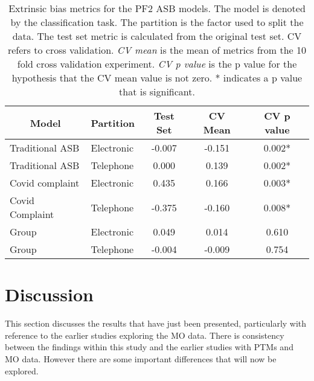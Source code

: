 \begin{table}[]
\begin{tabular}{@{}llccc@{}}
\multicolumn{1}{c}{Model} & \multicolumn{1}{c}{Partition} & Test Set & CV Mean & CV p value \\ \midrule
Traditional ASB                                   & Electronic                                            & -0.007   & -0.151  & 0.002*      \\
Traditional ASB                                   & Telephone                                             & 0.000    & 0.139   & 0.002*      \\
Covid complaint                                   & Electronic                                            & 0.435    & 0.166   & 0.003*      \\
Covid Complaint                                   & Telephone                                             & -0.375   & -0.160  & 0.008*      \\
Group                                         & Electronic                                            & 0.049    & 0.014   & 0.610      \\
Group                                         & Telephone                                             & -0.004   & -0.009  & 0.754      \\ \bottomrule
\end{tabular}
\caption[ASB incident logs Bias Table]{\label{tab:asb_bias} Extrinsic bias metrics for the PF2 ASB models. The model is denoted by the classification task. The partition is the factor used to split the data. The test set metric is calculated from the original test set. CV refers to cross validation. \emph{CV mean} is the mean of metrics from the 10 fold cross validation experiment. \emph{CV p value} is the p value for the hypothesis that the CV mean value is not zero. * indicates a p value that is significant.}
\end{table}

\section{Discussion} This section discusses the results that have just been presented, particularly with reference to the earlier studies exploring the MO data.  There is consistency between the findings within this study and the earlier studies with PTMs and MO data. However there are some important differences that will now be explored.


